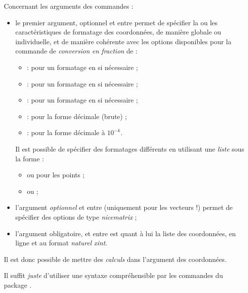 \begin{cautionblock}
Concernant les arguments des commandes :

\begin{itemize}
	\item le premier argument, optionnel et entre \ctex{[...]} permet de spécifier la ou les caractéristiques de formatage des coordonnées, de manière globale ou individuelle, et de manière cohérente avec les options disponibles pour la commande de \textit{conversion en fraction} de  :
	\begin{itemize}
			\item {} : pour un formatage en  si nécessaire ;
			\item {} : pour un formatage en  si nécessaire ;
			\item {} : pour un formatage en  si nécessaire ;
			\item {} : pour la forme décimale (brute) ;
			\item {} : pour la forme décimale à $10^{-k}$.
		\end{itemize}
	Il est possible de spécifier des formatages différents en utilisant une \textit{liste} sous la forme :
	\begin{itemize}
			\item {} ou  pour les points ;
			\item {} ou  ;
		\end{itemize}
	\item l'argument \textit{optionnel} et entre  (uniquement pour les vecteurs !) permet de spécifier des options de type \textit{nicematrix} ;
	\item l'argument obligatoire, et entre  est quant à lui la liste des coordonnées, en ligne et au format \textit{naturel xint}.
\end{itemize}
\vspace*{-\baselineskip}\leavevmode
\end{cautionblock}

\begin{noteblock}
Il est donc possible de mettre des \textit{calculs} dans l'argument des coordonnées.

Il suffit \textit{juste} d'utiliser une syntaxe compréhensible par les commandes du package .
\end{noteblock}

